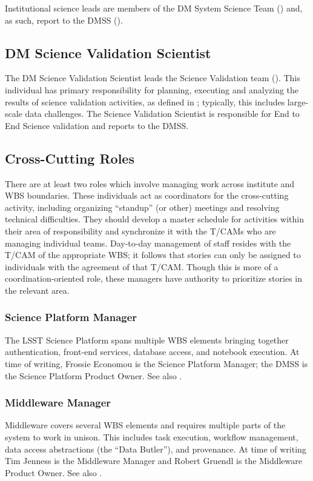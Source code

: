 Institutional science leads are members of the \gls{DM} System Science Team () and, as such, report to the \gls{DMSS} ().

\subsection{DM Science \gls{Validation} Scientist}
\label{role:dmsvs}

The \gls{DM} Science \gls{Validation} Scientist leads the Science \gls{Validation} team ().
This individual has primary responsibility for planning, executing and analyzing the results of science validation activities, as defined in ; typically, this includes large-scale data challenges.
The Science \gls{Validation} Scientist is responsible for End to End Science validation and reports to the \gls{DMSS}.

\subsection{Cross-Cutting Roles}\label{role:crosscut}

There are at least two roles which involve managing work across institute and \gls{WBS} boundaries.
These individuals act as coordinators for the cross-cutting activity, including organizing ``standup'' (or other) meetings and resolving technical difficulties.
They should develop a master schedule for activities within their area of responsibility and synchronize it with the T/CAMs who are managing individual teams.
Day-to-day management of staff resides with the \gls{T/CAM} of the appropriate \gls{WBS}; it follows that stories can only be assigned to individuals with the agreement of that \gls{T/CAM}.
Though this is more of a coordination-oriented role, these managers have authority to prioritize stories in the relevant area.

\subsubsection{Science Platform Manager}\label{role:lsplead}

The \gls{LSST} \gls{Science Platform} spans multiple \gls{WBS} elements bringing together authentication, front-end services, database access, and notebook execution.
At time of writing, Frossie Economou is the \gls{Science Platform} Manager; the \gls{DMSS} is the Science Platform Product Owner.
See also .

\subsubsection{Middleware Manager}\label{role:mwlead}

Middleware covers several \gls{WBS} elements and requires multiple parts of the system to work in unison.
This includes task execution, workflow management, data access abstractions (the ``Data \gls{Butler}''), and \gls{provenance}.
At time of writing Tim Jenness is the Middleware Manager and Robert Gruendl is the Middleware Product Owner.
See also .
